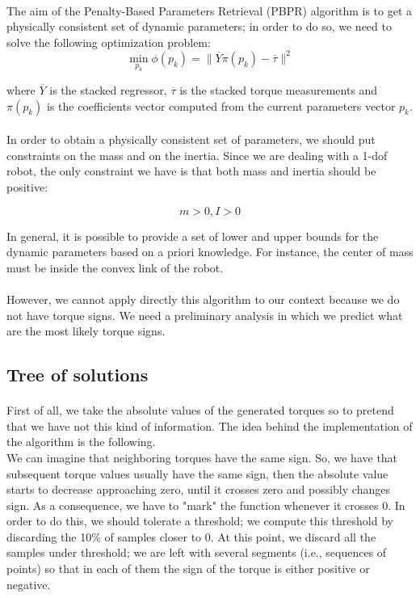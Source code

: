 \documentclass{article}
\begin{document}
\paragraph{}The aim of the Penalty-Based Parameters Retrieval (PBPR) algorithm is to get a physically consistent set of dynamic parameters; in order to do so, we need to solve the following optimization problem:
\[\min_{p_k}{\phi(p_k)} = \lVert \overline{Y}\pi(p_k)-\overline{\tau} \rVert^2\]

\noindent where $\overline{Y}$ is the stacked regressor, $\overline{\tau}$ is the stacked  torque measurements and $\pi(p_k)$ is the coefficients vector computed from the current parameters vector $p_k$.

\paragraph{}In order to obtain a physically consistent set of parameters, we should put constraints on the mass and on the inertia. Since we are dealing with a 1-dof robot, the only constraint we have is that both mass and inertia should be positive:

\[m > 0, I > 0\]

In general, it is possible to provide a set of lower and upper bounds for the dynamic parameters based on a priori knowledge. For instance, the center of mass must be inside the convex link of the robot. 

\paragraph{}However, we cannot apply directly this algorithm to our context because we do not have torque signs.  We need a preliminary analysis in which we predict what are the most likely torque signs.

\subsection{Tree of solutions}
\paragraph{}First of all, we take the absolute values of the generated torques so to pretend that we have not this kind of information. The idea behind the implementation of the algorithm is the following.\\

We can imagine that neighboring torques have the same sign. So, we have that subsequent torque values usually have the same sign, then the absolute value starts to decrease approaching zero, until it crosses zero and possibly changes sign. As a consequence, we have to "mark" the function whenever it crosses 0. In order to do this, we should tolerate a threshold; we compute this threshold by discarding the 10\% of samples closer to 0. At this point, we discard all the samples under threshold; we are left with several segments (i.e.,  sequences of points) so that in each of them the sign of the torque is either positive or negative.
\end{document}
